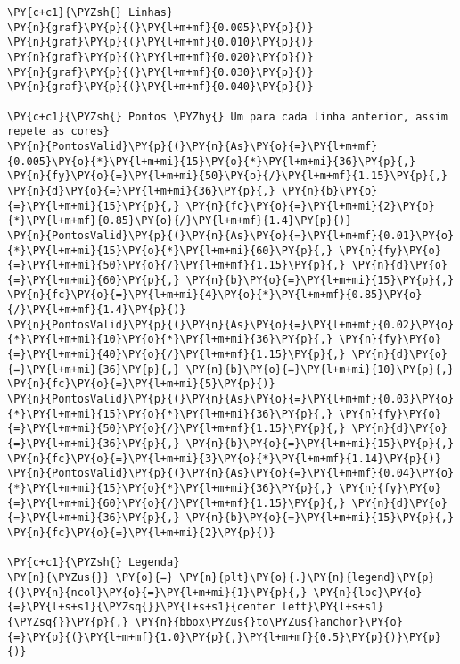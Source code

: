 \begin{tcolorbox}[breakable, size=fbox, boxrule=1pt, pad at break*=1mm,colback=cellbackground, colframe=cellborder]
\begin{Verbatim}[commandchars=\\\{\}]
\PY{c+c1}{\PYZsh{} Linhas}
\PY{n}{graf}\PY{p}{(}\PY{l+m+mf}{0.005}\PY{p}{)}
\PY{n}{graf}\PY{p}{(}\PY{l+m+mf}{0.010}\PY{p}{)}
\PY{n}{graf}\PY{p}{(}\PY{l+m+mf}{0.020}\PY{p}{)}
\PY{n}{graf}\PY{p}{(}\PY{l+m+mf}{0.030}\PY{p}{)}
\PY{n}{graf}\PY{p}{(}\PY{l+m+mf}{0.040}\PY{p}{)}

\PY{c+c1}{\PYZsh{} Pontos \PYZhy{} Um para cada linha anterior, assim repete as cores}
\PY{n}{PontosValid}\PY{p}{(}\PY{n}{As}\PY{o}{=}\PY{l+m+mf}{0.005}\PY{o}{*}\PY{l+m+mi}{15}\PY{o}{*}\PY{l+m+mi}{36}\PY{p}{,} \PY{n}{fy}\PY{o}{=}\PY{l+m+mi}{50}\PY{o}{/}\PY{l+m+mf}{1.15}\PY{p}{,} \PY{n}{d}\PY{o}{=}\PY{l+m+mi}{36}\PY{p}{,} \PY{n}{b}\PY{o}{=}\PY{l+m+mi}{15}\PY{p}{,} \PY{n}{fc}\PY{o}{=}\PY{l+m+mi}{2}\PY{o}{*}\PY{l+m+mf}{0.85}\PY{o}{/}\PY{l+m+mf}{1.4}\PY{p}{)}
\PY{n}{PontosValid}\PY{p}{(}\PY{n}{As}\PY{o}{=}\PY{l+m+mf}{0.01}\PY{o}{*}\PY{l+m+mi}{15}\PY{o}{*}\PY{l+m+mi}{60}\PY{p}{,} \PY{n}{fy}\PY{o}{=}\PY{l+m+mi}{50}\PY{o}{/}\PY{l+m+mf}{1.15}\PY{p}{,} \PY{n}{d}\PY{o}{=}\PY{l+m+mi}{60}\PY{p}{,} \PY{n}{b}\PY{o}{=}\PY{l+m+mi}{15}\PY{p}{,} \PY{n}{fc}\PY{o}{=}\PY{l+m+mi}{4}\PY{o}{*}\PY{l+m+mf}{0.85}\PY{o}{/}\PY{l+m+mf}{1.4}\PY{p}{)}
\PY{n}{PontosValid}\PY{p}{(}\PY{n}{As}\PY{o}{=}\PY{l+m+mf}{0.02}\PY{o}{*}\PY{l+m+mi}{10}\PY{o}{*}\PY{l+m+mi}{36}\PY{p}{,} \PY{n}{fy}\PY{o}{=}\PY{l+m+mi}{40}\PY{o}{/}\PY{l+m+mf}{1.15}\PY{p}{,} \PY{n}{d}\PY{o}{=}\PY{l+m+mi}{36}\PY{p}{,} \PY{n}{b}\PY{o}{=}\PY{l+m+mi}{10}\PY{p}{,} \PY{n}{fc}\PY{o}{=}\PY{l+m+mi}{5}\PY{p}{)}
\PY{n}{PontosValid}\PY{p}{(}\PY{n}{As}\PY{o}{=}\PY{l+m+mf}{0.03}\PY{o}{*}\PY{l+m+mi}{15}\PY{o}{*}\PY{l+m+mi}{36}\PY{p}{,} \PY{n}{fy}\PY{o}{=}\PY{l+m+mi}{50}\PY{o}{/}\PY{l+m+mf}{1.15}\PY{p}{,} \PY{n}{d}\PY{o}{=}\PY{l+m+mi}{36}\PY{p}{,} \PY{n}{b}\PY{o}{=}\PY{l+m+mi}{15}\PY{p}{,} \PY{n}{fc}\PY{o}{=}\PY{l+m+mi}{3}\PY{o}{*}\PY{l+m+mf}{1.14}\PY{p}{)}
\PY{n}{PontosValid}\PY{p}{(}\PY{n}{As}\PY{o}{=}\PY{l+m+mf}{0.04}\PY{o}{*}\PY{l+m+mi}{15}\PY{o}{*}\PY{l+m+mi}{36}\PY{p}{,} \PY{n}{fy}\PY{o}{=}\PY{l+m+mi}{60}\PY{o}{/}\PY{l+m+mf}{1.15}\PY{p}{,} \PY{n}{d}\PY{o}{=}\PY{l+m+mi}{36}\PY{p}{,} \PY{n}{b}\PY{o}{=}\PY{l+m+mi}{15}\PY{p}{,} \PY{n}{fc}\PY{o}{=}\PY{l+m+mi}{2}\PY{p}{)}

\PY{c+c1}{\PYZsh{} Legenda}
\PY{n}{\PYZus{}} \PY{o}{=} \PY{n}{plt}\PY{o}{.}\PY{n}{legend}\PY{p}{(}\PY{n}{ncol}\PY{o}{=}\PY{l+m+mi}{1}\PY{p}{,} \PY{n}{loc}\PY{o}{=}\PY{l+s+s1}{\PYZsq{}}\PY{l+s+s1}{center left}\PY{l+s+s1}{\PYZsq{}}\PY{p}{,} \PY{n}{bbox\PYZus{}to\PYZus{}anchor}\PY{o}{=}\PY{p}{(}\PY{l+m+mf}{1.0}\PY{p}{,}\PY{l+m+mf}{0.5}\PY{p}{)}\PY{p}{)}
\end{Verbatim}
\end{tcolorbox}

